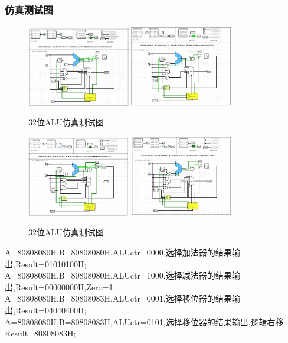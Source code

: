 \documentclass{article}
\begin{document}
    \subsubsection{仿真测试图}
    \begin{figure}[H]
    \centering
    \includegraphics[width=0.4\textwidth]{6.5.1.png}
    \includegraphics[width=0.4\textwidth]{6.5.2.png}
    \caption{32位ALU仿真测试图}
    \end{figure}

    \begin{figure}[H]
    \centering
    \includegraphics[width=0.4\textwidth]{6.5.3.png}
    \includegraphics[width=0.4\textwidth]{6.5.4.png}
    \caption{32位ALU仿真测试图}
    \end{figure}
    A=80808080H,B=80808080H,ALUctr=0000,选择加法器的结果输出,Result=01010100H;\\
    A=80808080H,B=80808080H,ALUctr=1000,选择减法器的结果输出,Result=00000000H,Zero=1;\\
    A=80808080H,B=80808083H,ALUctr=0001,选择移位器的结果输出,Result=04040400H;\\
    A=80808080H,B=80808083H,ALUctr=0101,选择移位器的结果输出,逻辑右移Result=80808083H;
\end{document}
